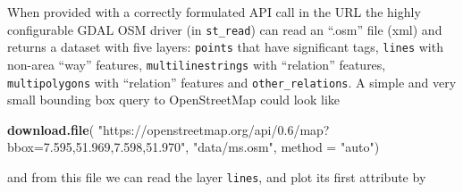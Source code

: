 \documentclass[]{book}
\newenvironment{Shaded}{\begin{snugshade}}{\end{snugshade}}
\newcommand{\DataTypeTok}[1]{\textcolor[rgb]{0.13,0.29,0.53}{#1}}
\newcommand{\DecValTok}[1]{\textcolor[rgb]{0.00,0.00,0.81}{#1}}
\newcommand{\FloatTok}[1]{\textcolor[rgb]{0.00,0.00,0.81}{#1}}
\newcommand{\KeywordTok}[1]{\textcolor[rgb]{0.13,0.29,0.53}{\textbf{#1}}}
\newcommand{\NormalTok}[1]{#1}
\newcommand{\OtherTok}[1]{\textcolor[rgb]{0.56,0.35,0.01}{#1}}
\newcommand{\StringTok}[1]{\textcolor[rgb]{0.31,0.60,0.02}{#1}}
\begin{document}
When provided with a correctly formulated API call in the URL the
highly configurable GDAL OSM driver (in \texttt{st\_read}) can read an
``.osm'' file (xml) and returns a dataset with five layers: \texttt{points}
that have significant tags, \texttt{lines} with non-area ``way'' features,
\texttt{multilinestrings} with ``relation'' features, \texttt{multipolygons} with
``relation'' features and \texttt{other\_relations}. A simple and very small
bounding box query to OpenStreetMap could look like

\begin{Shaded}
\begin{Highlighting}[]
\KeywordTok{download.file}\NormalTok{(}
  \StringTok{"https://openstreetmap.org/api/0.6/map?bbox=7.595,51.969,7.598,51.970"}\NormalTok{,}
  \StringTok{"data/ms.osm"}\NormalTok{, }\DataTypeTok{method =} \StringTok{"auto"}\NormalTok{)}
\end{Highlighting}
\end{Shaded}

and from this file we can read the layer \texttt{lines}, and plot its
first attribute by

\begin{Shaded}
\end{Shaded}
\end{document}
